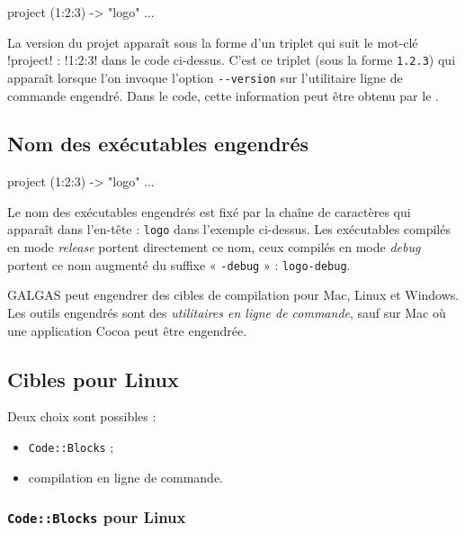 
\begin{galgas}
project (1:2:3) -> "logo" {
  ...
}
\end{galgas}

La version du projet apparaît sous la forme d'un triplet qui suit le mot-clé \ggs!project! : \ggs!1:2:3! dans le code ci-dessus. C'est ce triplet (sous la forme \texttt{1.2.3}) qui apparaît lorsque l'on invoque l'option \texttt{-{}-version} sur l'utilitaire ligne de commande engendré.
Dans le code, cette information peut être obtenu par le .


\subsection{Nom des exécutables engendrés}

\begin{galgas}
project (1:2:3) -> "logo" {
  ...
}
\end{galgas}

Le nom des exécutables engendrés est fixé par la chaîne de caractères qui apparaît dans l'en-tête : \texttt{logo} dans l'exemple ci-dessus. Les exécutables compilés en mode \emph{release} portent directement ce nom, ceux compilés en mode \emph{debug} portent ce nom augmenté du suffixe « \texttt{-debug} » : \texttt{logo-debug}.



GALGAS peut engendrer des cibles de compilation pour Mac, Linux et Windows. Les outils engendrés sont des \emph{utilitaires en ligne de commande}, sauf sur Mac où une application Cocoa peut être engendrée.

\subsection{Cibles pour Linux}

Deux choix sont possibles :
\begin{itemize}
\item \texttt{Code::Blocks} ;
\item compilation en ligne de commande.
\end{itemize}

\subsubsection{\texttt{Code::Blocks} pour Linux}

